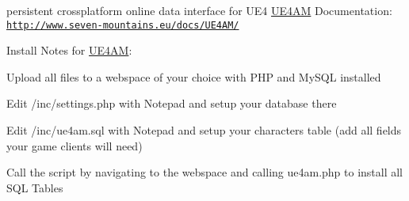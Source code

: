 persistent crossplatform online data interface for U\-E4 \hyperlink{class_u_e4_a_m}{U\-E4\-A\-M} Documentation\-: \href{http://www.seven-mountains.eu/docs/UE4AM/}{\tt http\-://www.\-seven-\/mountains.\-eu/docs/\-U\-E4\-A\-M/}

Install Notes for \hyperlink{class_u_e4_a_m}{U\-E4\-A\-M}\-:
\begin{DoxyEnumerate}
\item Upload all files to a webspace of your choice with P\-H\-P and My\-S\-Q\-L installed
\item Edit /inc/settings.php with Notepad and setup your database there
\item Edit /inc/ue4am.sql with Notepad and setup your characters table (add all fields your game clients will need)
\item Call the script by navigating to the webspace and calling ue4am.\-php to install all S\-Q\-L Tables 
\end{DoxyEnumerate}